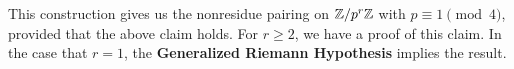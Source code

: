 \documentclass[landscape,final,columns=3]{baposter}
\begin{document}
\begin{poster}
{\begin{multicols}{2}
\begin{center}
\end{center}

This construction gives us the nonresidue pairing on $\mathbb{Z}/p^r\mathbb{Z}$ with $p\equiv 1\pmod 4$, provided that the above claim holds. For $r\ge2$, we have a proof of this claim. In the case that $r=1$, the \textbf{Generalized Riemann Hypothesis} implies the result. 


\end{multicols}

}

\end{poster}%
%
\end{document}
